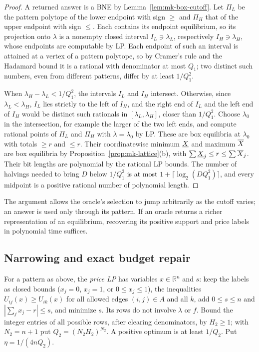 \begin{proof}
A returned answer is a BNE by Lemma~\ref{lem:mk-box-cutoff}. Let $\Pi_L$ be the pattern polytope of the
lower endpoint with sign $\ge$ and $\Pi_H$ that of the upper endpoint with sign $\le$. Each contains its
endpoint equilibrium, so its projection onto $\lambda$ is a nonempty closed interval $I_L\ni\lambda_L$,
respectively $I_H\ni\lambda_H$, whose endpoints are computable by LP. Each endpoint of such an interval
is attained at a vertex of a pattern polytope, so by Cramer's rule and the Hadamard bound it is a
rational with denominator at most $Q_1$; two distinct such numbers, even from different patterns,
differ by at least $1/Q_1^2$.

When $\lambda_H-\lambda_L<1/Q_1^2$, the intervals $I_L$ and $I_H$ intersect. Otherwise, since
$\lambda_L<\lambda_H$, $I_L$ lies strictly to the left of $I_H$, and the right end of $I_L$ and the left
end of $I_H$ would be distinct such rationals in $[\lambda_L,\lambda_H]$, closer than $1/Q_1^2$. Choose
$\lambda_0$ in the intersection, for example the larger of the two left ends, and compute rational
points of $\Pi_L$ and $\Pi_H$ with $\lambda=\lambda_0$ by LP. These are box equilibria at $\lambda_0$
with totals $\ge r$ and $\le r$. Their coordinatewise minimum $\underline{X}{}$ and maximum $\overline{X}{}$ are box equilibria by
Proposition~\ref{prop:mk-lattice}(b), with $\sum \underline{X}_j\le r\le\sum \overline{X}_j$. Their bit lengths are polynomial
by the rational LP bounds. The number of halvings needed to bring $D$ below $1/Q_1^2$ is at most
$1+\lceil\log_2(DQ_1^2)\rceil$, and every midpoint is a positive rational number of polynomial length.
\end{proof}

The argument allows the oracle's selection to jump arbitrarily as the cutoff varies; an answer is used
only through its pattern. If an oracle returns a richer representation of an equilibrium, recovering
its positive support and price labels in polynomial time suffices.

\subsection{Narrowing and exact budget repair}

For a pattern as above, the \emph{price LP} has variables $x\in\mathbb R^n$ and $s$: keep the labels as
closed bounds ($x_j=0$, $x_j=1$, or $0\le x_j\le1$), the inequalities $U_{ij}(x)\ge U_{ik}(x)$ for all
allowed edges $(i,j)\in A$ and all $k$, add $0\le s\le n$ and $|\sum_jx_j-r|\le s$, and minimize $s$.
Its rows do not involve $\lambda$ or $f$. Bound the integer entries of all possible rows, after
clearing denominators, by $H_2\ge1$; with $N_2=n+1$ put $Q_2=(N_2H_2)^{N_2}$. A positive optimum is at
least $1/Q_2$. Put $\eta=1/(4nQ_2)$.

